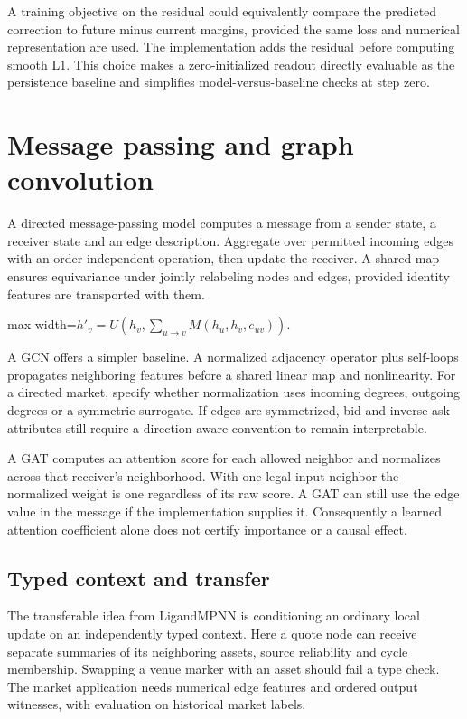 \documentclass[11pt,oneside,openany]{book}
\begin{document}
A training objective on the residual could equivalently compare the predicted correction to future minus current margins, provided the same loss and numerical representation are used. The implementation adds the residual before computing smooth L1. This choice makes a zero-initialized readout directly evaluable as the persistence baseline and simplifies model-versus-baseline checks at step zero.

\chapter{Message passing and graph convolution}
A directed message-passing model computes a message from a sender state, a receiver state and an edge description. Aggregate over permitted incoming edges with an order-independent operation, then update the receiver. A shared map ensures equivariance under jointly relabeling nodes and edges, provided identity features are transported with them.

\begin{center}\begin{adjustbox}{max width=\linewidth}$\displaystyle h'_v=U\!\left(h_v,\sum_{u\to v}M(h_u,h_v,e_{uv})\right).$\end{adjustbox}\end{center}
A GCN offers a simpler baseline. A normalized adjacency operator plus self-loops propagates neighboring features before a shared linear map and nonlinearity. For a directed market, specify whether normalization uses incoming degrees, outgoing degrees or a symmetric surrogate. If edges are symmetrized, bid and inverse-ask attributes still require a direction-aware convention to remain interpretable.

A GAT computes an attention score for each allowed neighbor and normalizes across that receiver's neighborhood. With one legal input neighbor the normalized weight is one regardless of its raw score. A GAT can still use the edge value in the message if the implementation supplies it. Consequently a learned attention coefficient alone does not certify importance or a causal effect.

\section*{Typed context and transfer}
The transferable idea from LigandMPNN is conditioning an ordinary local update on an independently typed context. Here a quote node can receive separate summaries of its neighboring assets, source reliability and cycle membership. Swapping a venue marker with an asset should fail a type check. The market application needs numerical edge features and ordered output witnesses, with evaluation on historical market labels.
\end{document}
